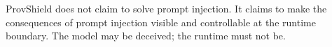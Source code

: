 \documentclass[sigconf,anonymous,review]{acmart}
\begin{document}
ProvShield does not claim to solve prompt injection. It claims to make the consequences of prompt injection visible and controllable at the runtime boundary. The model may be deceived; the runtime must not be.


\end{document}
